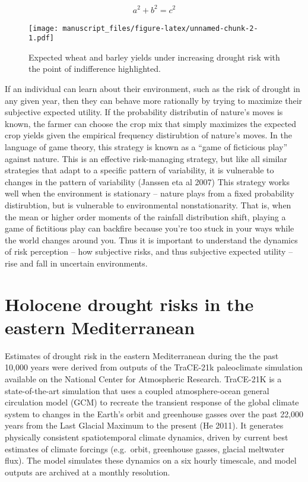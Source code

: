 \documentclass[smallextended]{svjour3}       %
\begin{document}
\begin{align}
a^2+b^2=c^2
\end{align}

\begin{figure}
\centering
\texttt{[image: manuscript\_files/figure-latex/unnamed-chunk-2-1.pdf]}
\caption{Expected wheat and barley yields under increasing drought risk
with the point of indifference highlighted.}
\end{figure}

If an individual can learn about their environment, such as the risk of
drought in any given year, then they can behave more rationally by
trying to maximize their subjective expected utility. If the probability
distributin of nature's moves is known, the farmer can choose the crop
mix that simply maximizes the expected crop yields given the empirical
frequency distirubtion of nature's moves. In the language of game
theory, this strategy is known as a ``game of ficticious play'' against
nature. This is an effective risk-managing strategy, but like all
similar strategies that adapt to a specific pattern of variability, it
is vulnerable to changes in the pattern of variability (Janssen eta al
2007) This strategy works well when the environment is stationary --
nature plays from a fixed probability distirubtion, but is vulnerable to
environmental nonstationarity. That is, when the mean or higher order
moments of the rainfall distribution shift, playing a game of fictitious
play can backfire because you're too stuck in your ways while the world
changes around you. Thus it is important to understand the dynamics of
risk perception -- how subjective risks, and thus subjective expected
utility -- rise and fall in uncertain environments.

\hypertarget{sec:2}{%
\section{Holocene drought risks in the eastern
Mediterranean}\label{sec:2}}

Estimates of drought risk in the eastern Mediterranean during the the
past 10,000 years were derived from outputs of the TraCE-21k
paleoclimate simulation available on the National Center for Atmospheric
Research. TraCE-21K is a state-of-the-art simulation that uses a coupled
atmosphere-ocean general circulation model (GCM) to recreate the
transient response of the global climate system to changes in the
Earth's orbit and greenhouse gasses over the past 22,000 years from the
Last Glacial Maximum to the present (He 2011). It generates physically
consistent spatiotemporal climate dynamics, driven by current best
estimates of climate forcings (e.g.~orbit, greenhouse gasses, glacial
meltwater flux). The model simulates these dynamics on a six hourly
timescale, and model outputs are archived at a monthly resolution.
\end{document}

